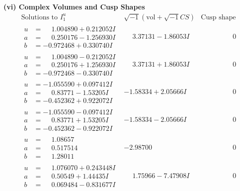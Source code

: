 \documentclass[1p]{elsarticle_modified}
\theoremstyle{definition}
\newcommand{\I}{\sqrt{-1}}
\begin{document}
\newpage\flushleft \textbf{(vi) Complex Volumes and Cusp Shapes}
$$\begin{array}{c|c|c}  
\text{Solutions to }I^u_{1}& \I (\text{vol} + \sqrt{-1}CS) & \text{Cusp shape}\\
 \hline 
\begin{aligned}
u &= \phantom{-}1.004890 + 0.212052 I \\
a &= \phantom{-}0.250176 - 1.256930 I \\
b &= -0.972468 + 0.330740 I\end{aligned}
 & \phantom{-}3.37131 - 1.86053 I & \phantom{-0.000000 } 0 \\ \hline\begin{aligned}
u &= \phantom{-}1.004890 - 0.212052 I \\
a &= \phantom{-}0.250176 + 1.256930 I \\
b &= -0.972468 - 0.330740 I\end{aligned}
 & \phantom{-}3.37131 + 1.86053 I & \phantom{-0.000000 } 0 \\ \hline\begin{aligned}
u &= -1.055590 + 0.097412 I \\
a &= \phantom{-}0.83771 - 1.53205 I \\
b &= -0.452362 + 0.922072 I\end{aligned}
 & -1.58334 + 2.05666 I & \phantom{-0.000000 } 0 \\ \hline\begin{aligned}
u &= -1.055590 - 0.097412 I \\
a &= \phantom{-}0.83771 + 1.53205 I \\
b &= -0.452362 - 0.922072 I\end{aligned}
 & -1.58334 - 2.05666 I & \phantom{-0.000000 } 0 \\ \hline\begin{aligned}
u &= \phantom{-}1.08657\phantom{ +0.000000I} \\
a &= \phantom{-}0.517514\phantom{ +0.000000I} \\
b &= \phantom{-}1.28011\phantom{ +0.000000I}\end{aligned}
 & -2.98700\phantom{ +0.000000I} & \phantom{-0.000000 } 0 \\ \hline\begin{aligned}
u &= \phantom{-}1.076070 + 0.243448 I \\
a &= \phantom{-}0.50549 + 1.44435 I \\
b &= \phantom{-}0.069484 - 0.831677 I\end{aligned}
 & \phantom{-}1.75966 - 7.47908 I & \phantom{-0.000000 } 0 \\ \hline\begin{aligned}

\end{aligned}
\end{array}$$
\end{document}
